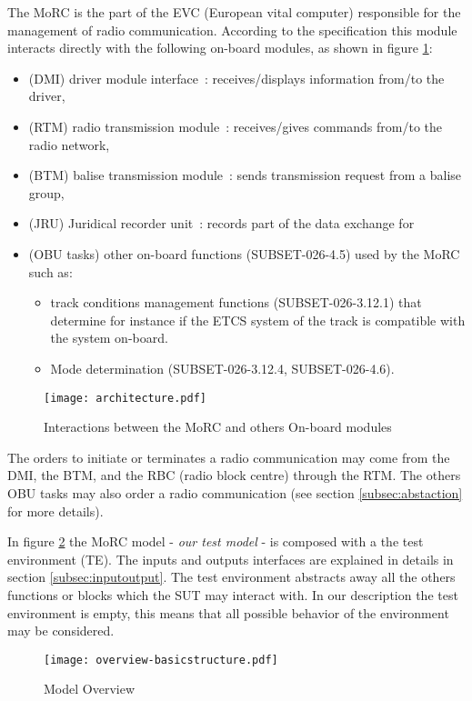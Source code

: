 
The MoRC is the part of the EVC (European vital computer) responsible for the
management of radio communication.
According to the specification this module interacts directly with the following
on-board modules, as shown in figure \ref{fig:arch}: 
\begin{itemize}
\item (DMI) driver module interface~: receives/displays information from/to the driver,
\item (RTM) radio transmission module~: receives/gives commands from/to the radio
network,
\item (BTM) balise transmission module~: sends transmission request from a balise group,
\item (JRU) Juridical recorder unit~: records part of the data exchange for
\item (OBU tasks) other on-board functions (SUBSET-026-4.5) used  by the MoRC such as:
\begin{itemize}
\item track conditions management functions  (SUBSET-026-3.12.1)
that determine for instance if the ETCS system of the track is compatible with the
system on-board.
\item Mode determination (SUBSET-026-3.12.4, SUBSET-026-4.6).

\end{itemize}
\end{itemize}

\begin{figure}[htpb]
\centering
\texttt{[image: architecture.pdf]}
\caption{\label{fig:arch}Interactions between the MoRC and others On-board modules}
\end{figure}

The orders to initiate or terminates a radio communication may come from the
DMI, the BTM, and the RBC (radio block centre) through the RTM. The others OBU
tasks may also order a radio communication (see section \ref{subsec:abstaction}
for more details).

In figure \ref{fig:overview} the MoRC model - \emph{our test model} - is composed
with a the test environment (TE). The inputs and outputs
interfaces are explained in details in section \ref{subsec:inputoutput}.
The test environment abstracts away all the others functions or blocks  which
the SUT may interact with. In our description the test environment is
empty, this means that all possible behavior of the environment may be considered.

\begin{figure}[htpb]
\centering
\texttt{[image: overview-basicstructure.pdf]}
\caption{\label{fig:overview} Model Overview}
\end{figure}

